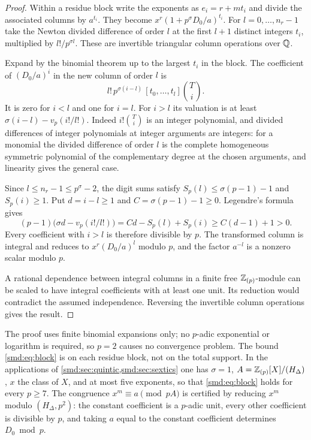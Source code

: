 \begin{proof}
Within a residue block write the exponents as $e_i=r+mt_i$ and divide the associated
columns by $a^{t_i}$. They become $x^r(1+p^\sigma D_0/a)^{t_i}$. For
$l=0,\dots,n_r-1$ take the Newton divided difference of order $l$ at the first $l+1$
distinct integers $t_i$, multiplied by $l!/p^{\sigma l}$. These are invertible triangular
column operations over $\mathbb{Q}$.

Expand by the binomial theorem up to the largest $t_i$ in the block. The coefficient of
$(D_0/a)^i$ in the new column of order $l$ is
\[
 l!\,p^{\sigma(i-l)}\,[t_0,\dots,t_l]\binom Ti .
\]
It is zero for $i<l$ and one for $i=l$. For $i>l$ its valuation is at least
$\sigma(i-l)-v_p(i!/l!)$. Indeed $i!\binom Ti$ is an integer polynomial, and divided
differences of integer polynomials at integer arguments are integers: for a monomial the
divided difference of order $l$ is the complete homogeneous symmetric polynomial of the
complementary degree at the chosen arguments, and linearity gives the general case.

Since $l\le n_r-1\le p^\sigma-2$, the digit sums satisfy $S_p(l)\le\sigma(p-1)-1$ and
$S_p(i)\ge1$. Put $d=i-l\ge1$ and $C=\sigma(p-1)-1\ge0$. Legendre's formula gives
\[
 (p-1)\bigl(\sigma d-v_p(i!/l!)\bigr)=Cd-S_p(l)+S_p(i)\ge C(d-1)+1>0 .
\]
Every coefficient with $i>l$ is therefore divisible by $p$. The transformed column is
integral and reduces to $x^r(D_0/a)^l$ modulo $p$, and the factor $a^{-l}$ is a nonzero
scalar modulo $p$.

A rational dependence between integral columns in a finite free $\mathbb{Z}_{(p)}$-module can be
scaled to have integral coefficients with at least one unit. Its reduction would
contradict the assumed independence. Reversing the invertible column operations gives the
result.
\end{proof}

The proof uses finite binomial expansions only; no $p$-adic exponential or logarithm is
required, so $p=2$ causes no convergence problem. The bound \eqref{smd:eq:block} is on each
residue block, not on the total support. In the applications of
\cref{smd:sec:quintic,smd:sec:sextics} one has $\sigma=1$, $A=\mathbb{Z}_{(p)}[X]/(H_\Delta)$, $x$
the class of $X$, and at most five exponents, so that \eqref{smd:eq:block} holds for every
$p\ge7$. The congruence $x^m\equiv a\pmod{pA}$ is certified by reducing $x^m$ modulo
$(H_\Delta,p^2)$: the constant coefficient is a $p$-adic unit, every other coefficient is
divisible by $p$, and taking $a$ equal to the constant coefficient determines
$D_0\bmod p$.

